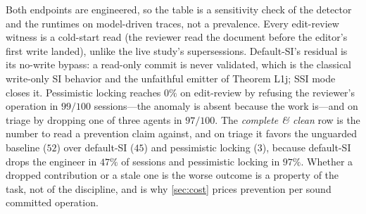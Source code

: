 Both endpoints are engineered, so the table is a sensitivity check of the
detector and the runtimes on model-driven traces, not a prevalence. Every
edit-review witness is a cold-start read (the reviewer read the document
before the editor's first write landed), unlike the live study's
supersessions.
Default-SI's residual is its no-write bypass: a read-only commit is never
validated, which is the classical write-only SI behavior and the unfaithful
emitter of Theorem L1j; SSI mode closes it. Pessimistic locking reaches
$0\%$ on edit-review by refusing the reviewer's operation in $99/100$
sessions---the anomaly is absent because the work is---and on triage by
dropping one of three agents in $97/100$. The \emph{complete \& clean} row is
the number to read a prevention claim against, and on triage it favors the
unguarded baseline ($52$) over default-SI ($45$) and pessimistic locking
($3$), because default-SI drops the engineer in $47\%$ of sessions and
pessimistic locking in $97\%$. Whether a dropped contribution or a stale one
is the worse outcome is a property of the task, not of the discipline, and
is why \cref{sec:cost} prices prevention per sound committed operation.

